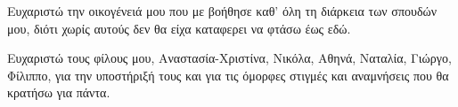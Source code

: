 \begin{acknowledgements}
Ευχαριστώ την οικογένειά μου που με βοήθησε καθ' όλη τη διάρκεια των σπουδών μου, διότι χωρίς αυτούς δεν θα είχα καταφερει να φτάσω έως εδώ.

Ευχαριστώ τους φίλους μου, Αναστασία-Χριστίνα, Νικόλα, Αθηνά, Ναταλία, Γιώργο, Φίλιππο, για την υποστήριξή τους και για τις όμορφες στιγμές και αναμνήσεις που θα κρατήσω για πάντα.


\bigskip

\bigskip

\bigskip

\end{acknowledgements}
